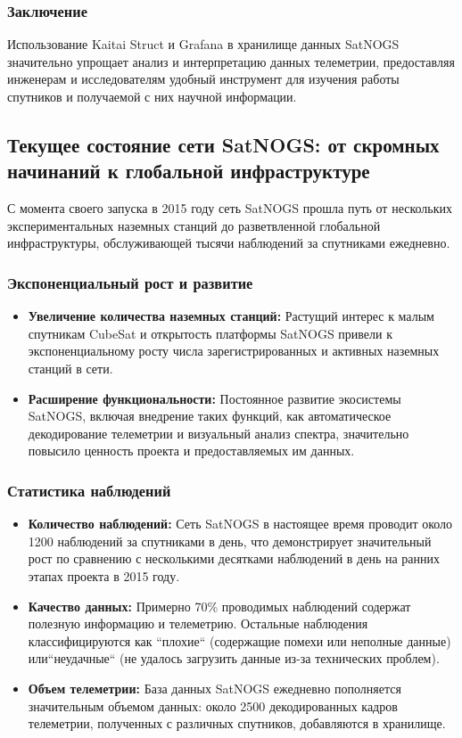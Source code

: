 \documentclass[14pt, a4paper]{extreport}
\begin{document}
    \subsubsection{Заключение}

    Использование Kaitai Struct и Grafana в хранилище данных SatNOGS значительно упрощает анализ и интерпретацию данных телеметрии, предоставляя инженерам и исследователям удобный инструмент для изучения работы спутников и получаемой с них научной информации.

    \subsection{Текущее состояние сети SatNOGS: от скромных начинаний к глобальной инфраструктуре}

    С момента своего запуска в 2015 году сеть SatNOGS прошла путь от нескольких экспериментальных наземных станций до разветвленной глобальной инфраструктуры, обслуживающей тысячи наблюдений за спутниками ежедневно.

    \subsubsection{Экспоненциальный рост и развитие}

    \begin{itemize}
        \item \textbf{Увеличение количества наземных станций:} Растущий интерес к малым спутникам CubeSat и открытость платформы SatNOGS привели к экспоненциальному росту числа зарегистрированных и активных наземных станций в сети.
        \item \textbf{Расширение функциональности:}  Постоянное развитие экосистемы SatNOGS, включая внедрение таких функций, как автоматическое декодирование телеметрии и визуальный анализ спектра,  значительно повысило ценность проекта и предоставляемых им данных.
    \end{itemize}

    \subsubsection{Статистика наблюдений}

    \begin{itemize}
        \item \textbf{Количество наблюдений:} Сеть SatNOGS в настоящее время проводит около 1200 наблюдений за спутниками в день, что демонстрирует значительный рост по сравнению с несколькими десятками наблюдений в день на ранних этапах проекта в 2015 году.
        \item \textbf{Качество данных:} Примерно 70\% проводимых наблюдений содержат полезную информацию и телеметрию.
        Остальные наблюдения классифицируются как ``плохие`` (содержащие помехи или неполные данные) или``неудачные`` (не удалось загрузить данные из-за технических проблем).
        \item \textbf{Объем телеметрии:}  База данных SatNOGS ежедневно пополняется значительным объемом данных: около 2500 декодированных кадров телеметрии, полученных с различных спутников,  добавляются в хранилище.
    \end{itemize}
\end{document}
